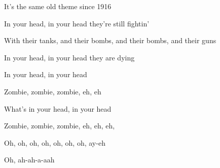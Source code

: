 \begin{song}
It’s the same old theme since 1916 \par
In your head, in your head they’re still fightin’ \par
With their tanks, and their bombs, and their bombs, and their guns \par
In your head, in your head they are dying \par
 
\bigskip

In your head, in your head \par
Zombie, zombie, zombie, eh, eh \par
What’s in your head, in your head \par
Zombie, zombie, zombie, eh, eh, eh, \par
{}Oh, oh, oh, oh, oh, oh, oh, ay-eh \par
{}Oh, ah-ah-a-aah \par

\bigskip


\end{song}
